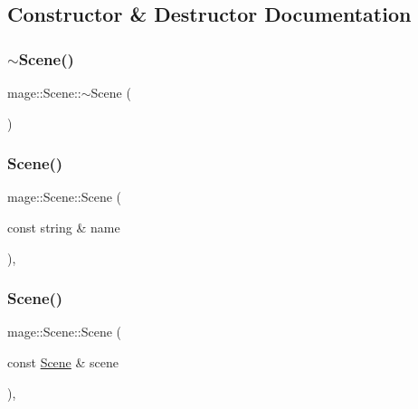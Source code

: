 \subsection{Constructor \& Destructor Documentation}
\hypertarget{classmage_1_1_scene_adc40910fdca62586659c2961fe7e7f3c}{}\label{classmage_1_1_scene_adc40910fdca62586659c2961fe7e7f3c} 
\subsubsection{\texorpdfstring{$\sim$\+Scene()}{~Scene()}}
{\footnotesize\ttfamily mage\+::\+Scene\+::$\sim$\+Scene (\begin{DoxyParamCaption}{ }\end{DoxyParamCaption})\hspace{0.3cm}{\ttfamily [virtual]}}

\hypertarget{classmage_1_1_scene_aab61b38547fc53aa9c5b3b559f4d2e26}{}\label{classmage_1_1_scene_aab61b38547fc53aa9c5b3b559f4d2e26} 
\subsubsection{\texorpdfstring{Scene()}{Scene()}\hspace{0.1cm}{\footnotesize\ttfamily [1/3]}}
{\footnotesize\ttfamily mage\+::\+Scene\+::\+Scene (\begin{DoxyParamCaption}\item[{const string \&}]{name }\end{DoxyParamCaption})\hspace{0.3cm}{\ttfamily [explicit]}, {\ttfamily [protected]}}

\hypertarget{classmage_1_1_scene_a88d83ccb2e10549d5370f850b2b4c228}{}\label{classmage_1_1_scene_a88d83ccb2e10549d5370f850b2b4c228} 
\subsubsection{\texorpdfstring{Scene()}{Scene()}\hspace{0.1cm}{\footnotesize\ttfamily [2/3]}}
{\footnotesize\ttfamily mage\+::\+Scene\+::\+Scene (\begin{DoxyParamCaption}\item[{const \hyperlink{classmage_1_1_scene}{Scene} \&}]{scene }\end{DoxyParamCaption})\hspace{0.3cm}{\ttfamily [protected]}, {\ttfamily [delete]}}

